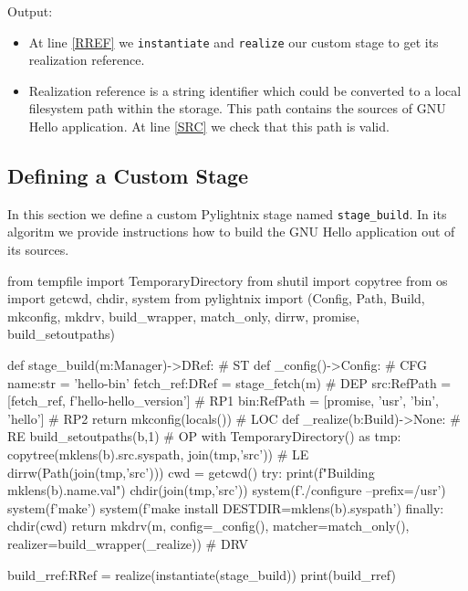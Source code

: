 Output:

\mysmallstdout

\begin{itemize}

  \item At line \ref{RREF} we \texttt{instantiate} and \texttt{realize} our
    custom stage to get its realization reference.

  \item Realization reference is a string identifier which could be converted to
    a local filesystem path within the storage. This path contains the sources
    of GNU Hello application. At line \ref{SRC} we check that this path is
    valid.

\end{itemize}

\pagebreak
\subsection{Defining a Custom Stage}

In this section we define a custom Pylightnix stage named \texttt{stage\_build}.
In its algoritm we provide instructions how to build the GNU Hello application
out of its sources.

\begin{pythontexcode}
from tempfile import TemporaryDirectory
from shutil import copytree
from os import getcwd, chdir, system
from pylightnix import (Config, Path, Build, mkconfig, mkdrv,
  build_wrapper, match_only, dirrw, promise, build_setoutpaths)

def stage_build(m:Manager)->DRef:                            # ST \label{ST}
  def _config()->Config:                                     # CFG \label{CFG}
    name:str = 'hello-bin'
    fetch_ref:DRef = stage_fetch(m)                          # DEP \label{DEP}
    src:RefPath = [fetch_ref, f'hello-{hello_version}']      # RP1 \label{RP1}
    bin:RefPath = [promise, 'usr', 'bin', 'hello']           # RP2 \label{RP2}
    return mkconfig(locals())                                # LOC \label{LOC}
  def _realize(b:Build)->None:                               # RE \label{RE}
    build_setoutpaths(b,1)                                   # OP \label{OP}
    with TemporaryDirectory() as tmp:
      copytree(mklens(b).src.syspath, join(tmp,'src'))       # LE \label{LE}
      dirrw(Path(join(tmp,'src')))
      cwd = getcwd()
      try:
        print(f"Building {mklens(b).name.val}")
        chdir(join(tmp,'src'))
        system(f'./configure --prefix=/usr')
        system(f'make')
        system(f'make install DESTDIR={mklens(b).syspath}')
      finally:
        chdir(cwd)
  return mkdrv(m, config=_config(),
                  matcher=match_only(),
                  realizer=build_wrapper(_realize))          # DRV \label{DRV}

build_rref:RRef = realize(instantiate(stage_build))
print(build_rref)
\end{pythontexcode}

